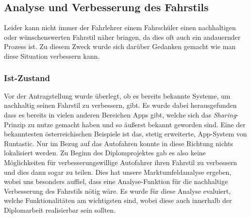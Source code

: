 \subsection{Analyse und Verbesserung des Fahrstils}
Leider kann nicht immer der Fahrlehrer einem Fahrschüler einen nachhaltigen oder wünschenswerten Fahrstil näher bringen, da dies oft auch ein andauernder Prozess ist. Zu diesem Zweck wurde sich darüber Gedanken gemacht wie man diese Situation verbessern kann.
\subsubsection{Ist-Zustand}
Vor der Antragstellung wurde überlegt, ob es bereits bekannte Systeme, um nachhaltig seinen Fahrstil zu verbessern, gibt. Es wurde dabei herausgefunden dass es bereits in vielen anderen Bereichen Apps gibt, welche sich das \textit{Sharing}-Prinzip zu nutze gemacht haben und so äußerst bekannt geworden sind. Eine der bekanntesten österreichischen Beispiele ist das, stetig erweiterte, App-System von Runtastic. \cite{Businessplan.Runtastic}
Nur im Bezug auf das Autofahren konnte in diese Richtung nichts lokalisiert werden.
\newline
Zu Beginn des Diplomprojektes gab es also keine Möglichkeiten für verbesserungswillige Autofahrer ihren Fahrstil zu verbessern und dies dann sogar zu teilen. 
Dies hat unsere Marktumfeldanalyse ergeben, wobei uns besonders auffiel, dass eine Analyse-Funktion für die nachhaltige Verbesserung des Fahrstils nötig wäre. Es wurde für diese Analyse evaluiert, welche Funktionalitäten am wichtigsten sind, wobei diese auch innerhalb der Diplomarbeit realisierbar sein sollten.
